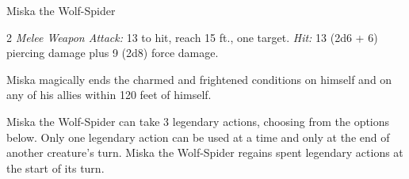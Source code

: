 \documentclass[10pt,a4paper,twoside,bg=print,twocolumn,openany,nodeprecatedcode]{dndbook}
\begin{document}
\begin{DndMonster}[float*=b,width=\textwidth + 8pt]{Miska the Wolf-Spider}
\begin{multicols}{2}
\textsl{Melee Weapon Attack:} 13 to hit, reach 15 ft., one target. \textsl{Hit:} 13 (2d6 + 6) piercing damage plus 9 (2d8) force damage.

Miska magically ends the charmed and frightened conditions on himself and on any of his allies within 120 feet of himself.

Miska the Wolf-Spider can take 3 legendary actions, choosing from the options below. Only one legendary action can be used at a time and only at the end of another creature's turn. Miska the Wolf-Spider regains spent legendary actions at the start of its turn.

\begin{DndMonsterLegendaryActions}
\end{DndMonsterLegendaryActions}
\end{multicols}
\end{DndMonster}
\end{document}
